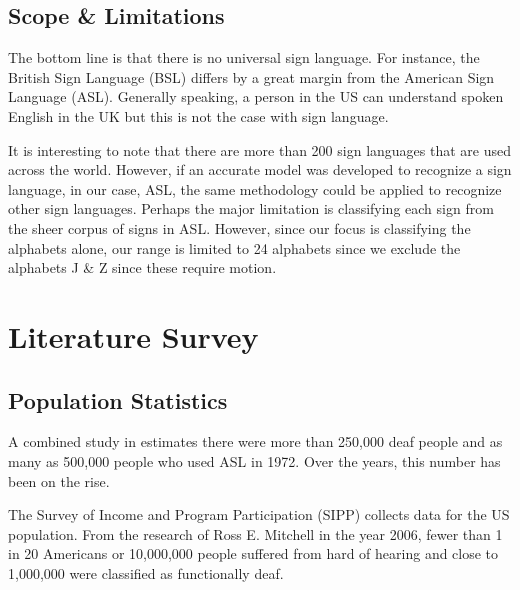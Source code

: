 \documentclass[twocolumn]{article}
\begin{document}
\subsection{Scope \& Limitations}
The bottom line is that there is no universal sign language. For instance, the 
British Sign Language (BSL) differs by a great margin from the American Sign 
Language (ASL). Generally speaking, a person in the US can understand spoken 
English in the UK but this is not the case with sign language.

It is interesting to note that there are more than 200 sign languages that are 
used across the world. However, if an accurate model was developed to 
recognize a sign language, in our case, ASL, the same methodology could be 
applied to recognize other sign languages. Perhaps the major limitation is 
classifying each sign from the sheer corpus of signs in ASL.
However, since our focus is 
classifying the alphabets alone, our range is limited to 24 alphabets since we 
exclude the alphabets J \& Z since these require motion.

\section{Literature Survey}

\subsection{Population Statistics}
A combined study in \cite{mitchell2006many} estimates there were more than 250,000 deaf people and 
as many as 500,000 people who used ASL in 1972. Over the years, this number 
has been on the rise.

The Survey of Income and Program Participation (SIPP) collects data for the US 
population. From the research of Ross E. Mitchell \cite{mitchell2006many} in the year 2006, fewer 
than 1 in 20 Americans or 10,000,000 people suffered from hard of hearing and 
close to 1,000,000 were classified as functionally deaf.



\end{document}
